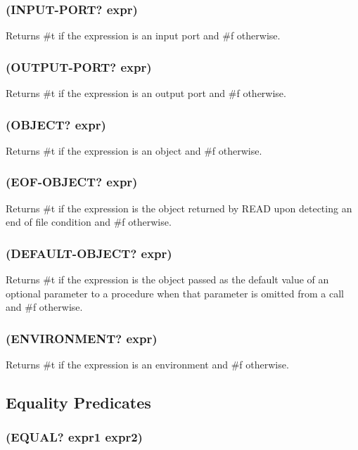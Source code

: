 \documentclass[11pt]{article}
\begin{document}
\subsubsection{(INPUT-PORT? expr)}
\label{sec-4-23-18}

Returns \#t if the expression is an input port and \#f otherwise.
\subsubsection{(OUTPUT-PORT? expr)}
\label{sec-4-23-19}

Returns \#t if the expression is an output port and \#f otherwise.
\subsubsection{(OBJECT? expr)}
\label{sec-4-23-20}

Returns \#t if the expression is an object and \#f otherwise.
\subsubsection{(EOF-OBJECT? expr)}
\label{sec-4-23-21}

Returns \#t if the expression is the object returned by READ upon
detecting an end of file condition and \#f otherwise.
\subsubsection{(DEFAULT-OBJECT? expr)}
\label{sec-4-23-22}

Returns \#t if the expression is the object passed as the default
value of an optional parameter to a procedure when that parameter is
omitted from a call and \#f otherwise.
\subsubsection{(ENVIRONMENT? expr)}
\label{sec-4-23-23}

Returns \#t if the expression is an environment and \#f otherwise.
\subsection{Equality Predicates}
\label{sec-4-24}

\subsubsection{(EQUAL? expr1 expr2)}
\label{sec-4-24-1}
\end{document}

